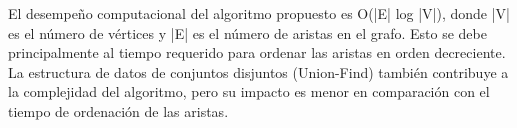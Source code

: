 El desempeño computacional del algoritmo propuesto es O(|E| log |V|), donde |V| es el número de vértices y |E| es el número de aristas en el grafo. Esto se debe principalmente al tiempo requerido para ordenar las aristas en orden decreciente. La estructura de datos de conjuntos disjuntos (Union-Find) también contribuye a la complejidad del algoritmo, pero su impacto es menor en comparación con el tiempo de ordenación de las aristas.


